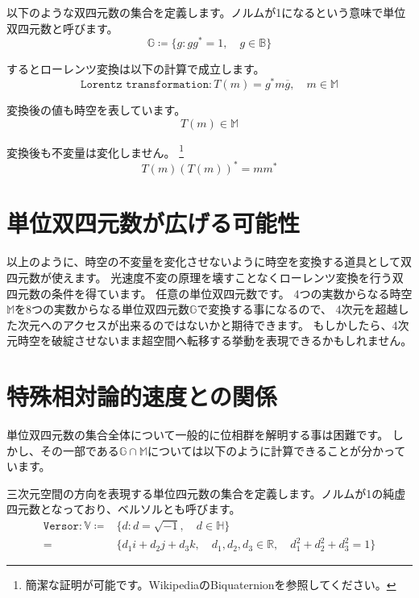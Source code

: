\documentclass[a4paper,12pt,notitlepage]{jsreport}
\begin{document}
以下のような双四元数の集合を定義します。ノルムが1になるという意味で単位双四元数と呼びます。
\begin{equation}
  \mathbb{G}\coloneq\{g:gg^*=1,\quad g\in\mathbb{B}\}
\end{equation}

するとローレンツ変換は以下の計算で成立します。
\begin{equation}
  \texttt{Lorentz transformation}:T(m)=g^*m\overline{g},\quad m\in\mathbb{M}
\end{equation}

変換後の値も時空を表しています。
\begin{equation}
  T(m)\in\mathbb{M}
\end{equation}

変換後も不変量は変化しません。
\footnote{簡潔な証明が可能です。WikipediaのBiquaternionを参照してください。}
\begin{equation}
  T(m)(T(m))^*=mm^*
\end{equation}

\section{単位双四元数が広げる可能性}

以上のように、時空の不変量を変化させないように時空を変換する道具として双四元数が使えます。
光速度不変の原理を壊すことなくローレンツ変換を行う双四元数の条件を得ています。
任意の単位双四元数です。
4つの実数からなる時空$\mathbb{M}$を8つの実数からなる単位双四元数$\mathbb{G}$で変換する事になるので、
4次元を超越した次元へのアクセスが出来るのではないかと期待できます。
もしかしたら、4次元時空を破綻させないまま超空間へ転移する挙動を表現できるかもしれません。

\section{特殊相対論的速度との関係}

単位双四元数の集合全体について一般的に位相群を解明する事は困難です。
しかし、その一部である$\mathbb{G}\cap\mathbb{M}$については以下のように計算できることが分かっています。

三次元空間の方向を表現する単位四元数の集合を定義します。ノルムが1の純虚四元数となっており、ベルソルとも呼びます。
\begin{equation}
  \begin{split}
    \texttt{Versor}:\mathbb{V}\coloneq&\{d:d=\sqrt{-1},\quad d\in\mathbb{H}\}\\
    =&\{d_1i+d_2j+d_3k,\quad d_1,d_2,d_3\in\mathbb{R},\quad d_1^2+d_2^2+d_3^2=1\}
  \end{split}
\end{equation}
\end{document}
